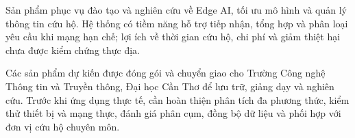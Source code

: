 Sản phẩm phục vụ đào tạo và nghiên cứu về Edge AI, tối ưu mô hình và quản lý thông tin cứu hộ. Hệ thống có tiềm năng hỗ trợ tiếp nhận, tổng hợp và phân loại yêu cầu khi mạng hạn chế; lợi ích về thời gian cứu hộ, chi phí và giảm thiệt hại chưa được kiểm chứng thực địa.

Các sản phẩm dự kiến được đóng gói và chuyển giao cho Trường Công nghệ Thông tin và Truyền thông, Đại học Cần Thơ để lưu trữ, giảng dạy và nghiên cứu. Trước khi ứng dụng thực tế, cần hoàn thiện phân tích đa phương thức, kiểm thử thiết bị và mạng thực, đánh giá phân cụm, đồng bộ dữ liệu và phối hợp với đơn vị cứu hộ chuyên môn.
